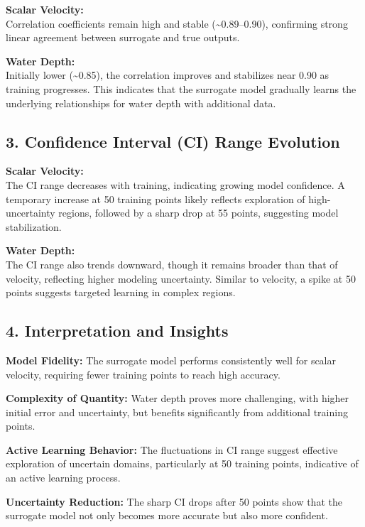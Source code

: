 \documentclass[draft,linenumbers,onecolumn]{agujournal2019} %
\begin{document}
\textbf{Scalar Velocity:} \\
Correlation coefficients remain high and stable (\textasciitilde0.89–0.90), confirming strong linear agreement between surrogate and true outputs.

\textbf{Water Depth:} \\
Initially lower (\textasciitilde0.85), the correlation improves and stabilizes near 0.90 as training progresses. This indicates that the surrogate model gradually learns the underlying relationships for water depth with additional data.

\subsection*{3. Confidence Interval (CI) Range Evolution}

\textbf{Scalar Velocity:} \\
The CI range decreases with training, indicating growing model confidence. A temporary increase at 50 training points likely reflects exploration of high-uncertainty regions, followed by a sharp drop at 55 points, suggesting model stabilization.

\textbf{Water Depth:} \\
The CI range also trends downward, though it remains broader than that of velocity, reflecting higher modeling uncertainty. Similar to velocity, a spike at 50 points suggests targeted learning in complex regions.

\subsection*{4. Interpretation and Insights}

\textbf{Model Fidelity:} The surrogate model performs consistently well for scalar velocity, requiring fewer training points to reach high accuracy.

\textbf{Complexity of Quantity:} Water depth proves more challenging, with higher initial error and uncertainty, but benefits significantly from additional training points.

\textbf{Active Learning Behavior:} The fluctuations in CI range suggest effective exploration of uncertain domains, particularly at 50 training points, indicative of an active learning process.

\textbf{Uncertainty Reduction:} The sharp CI drops after 50 points show that the surrogate model not only becomes more accurate but also more confident.
\end{document}
